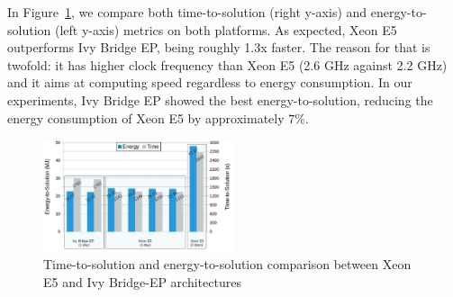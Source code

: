 In Figure~\ref{fig:3}, we compare both time-to-solution (right y-axis)
and  energy-to-solution (left  y-axis) metrics  on both  platforms. As
expected,  Xeon  E5 outperforms  Ivy  Bridge  EP,  being roughly  1.3x
faster.  The reason for that is twofold: it has higher clock frequency
than Xeon E5 (2.6 GHz against  2.2 GHz) and it aims at computing speed
regardless to  energy consumption. In  our experiments, Ivy  Bridge EP
showed the best energy-to-solution, reducing the energy consumption of
Xeon E5 by approximately $7\%$.

\begin{figure}[htbf]
  \includegraphics[width=0.5\textwidth]{Figs/Time_E2S_COSMO-ART.eps}
  \caption{Time-to-solution and  energy-to-solution comparison between
    Xeon E5 and Ivy Bridge-EP architectures}
  \label{fig:3}
\end{figure}


















